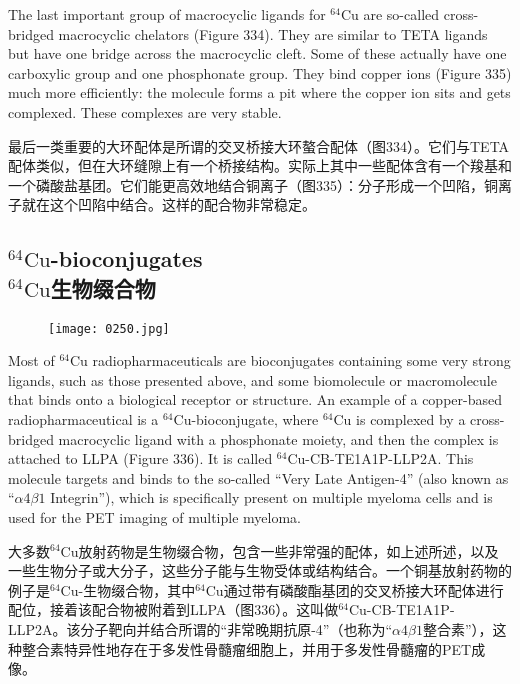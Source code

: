 \documentclass[dvipsnames, svgnames,a4paper,11pt]{article}
\begin{document}
The last important group of macrocyclic ligands for \(\mathrm{^{64}Cu}\) are so-called cross-bridged macrocyclic chelators (Figure 334). They are similar to TETA ligands but have one bridge across the macrocyclic cleft. Some of these actually have one carboxylic group and one phosphonate group. They bind copper ions (Figure 335) much more efficiently: the molecule forms a pit where the copper ion sits and gets complexed. These complexes are very stable.

最后一类重要的大环配体是所谓的交叉桥接大环螯合配体（图334）。它们与TETA配体类似，但在大环缝隙上有一个桥接结构。实际上其中一些配体含有一个羧基和一个磷酸盐基团。它们能更高效地结合铜离子（图335）：分子形成一个凹陷，铜离子就在这个凹陷中结合。这样的配合物非常稳定。

\subsection{\(\mathrm{^{64}Cu}\)-bioconjugates\\ \(\mathrm{^{64}Cu}\)生物缀合物}  

\begin{figure}[h]
	\centering
    \texttt{[image: 0250.jpg]}  
     \label{fig336}
\end{figure}

Most of \(\mathrm{^{64}Cu}\) radiopharmaceuticals are bioconjugates containing some very strong ligands, such as those presented above, and some biomolecule or macromolecule that binds onto a biological receptor or structure. An example of a copper-based radiopharmaceutical is a \(\mathrm{^{64}Cu}\)-bioconjugate, where \(\mathrm{^{64}Cu}\) is complexed by a cross-bridged macrocyclic ligand with a phosphonate moiety, and then the complex is attached to LLPA (Figure 336). It is called \(\mathrm{^{64}Cu}\)-CB-TE1A1P-LLP2A. This molecule targets and binds to the so-called “Very Late Antigen-4” (also known as “\(\alpha4\beta1\) Integrin”), which is specifically present on multiple myeloma cells and is used for the PET imaging of multiple myeloma.  

大多数\(\mathrm{^{64}Cu}\)放射药物是生物缀合物，包含一些非常强的配体，如上述所述，以及一些生物分子或大分子，这些分子能与生物受体或结构结合。一个铜基放射药物的例子是\(\mathrm{^{64}Cu}\)-生物缀合物，其中\(\mathrm{^{64}Cu}\)通过带有磷酸酯基团的交叉桥接大环配体进行配位，接着该配合物被附着到LLPA（图336）。这叫做\(\mathrm{^{64}Cu}\)-CB-TE1A1P-LLP2A。该分子靶向并结合所谓的“非常晚期抗原-4”（也称为“\(\alpha4\beta1\)整合素”），这种整合素特异性地存在于多发性骨髓瘤细胞上，并用于多发性骨髓瘤的PET成像。  
\end{document}

